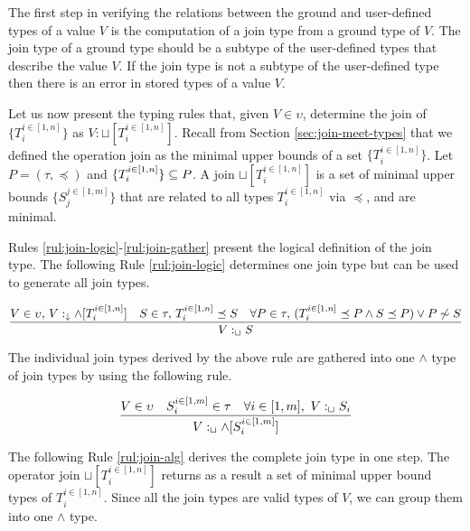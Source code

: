 \documentclass[runningheads]{llncs}
\newcommand{\darr}{\downarrow}
\newcommand{\llb}{\llbracket}
\newcommand{\rrb}{\rrbracket}
\newcommand{\nnotes}[1]{\indent\begin{small}-- \emph{#1}\hfill\break\end{small}}
\newcommand{\ennotes}[1]{\indent\begin{small}-- \emph{#1}\hfill\end{small}}
\begin{document}
The first step in verifying the relations between the ground and
user-defined types of a value $V$ is the computation of a join type
from a ground type of $V$. The join type of a ground type should be a
subtype of the user-defined types that describe the value $V$. If the
join type is not a subtype of the user-defined type then there is an
error in stored types of a value $V$.

Let us now present the typing rules that, given $V\in\upsilon$,
determine the join of $\{T_i^{i\in[1,n]}\}$ as
$V:\sqcup[T_i^{i\in[1,n]}]$. Recall from Section
\ref{sec:join-meet-types} that we defined the operation join as the
minimal upper bounds of a set $\{T_i^{i\in[1,n]}\}$. Let
$P=(\tau,\preceq)$ and $\{T_i^{i\in[1,n]}\}\subseteq\/P$. A join
$\sqcup[T_i^{i\in[1,n]}]$ is a set of minimal upper bounds
$\{S_j^{j\in[1,m]}\}$ that are related to all types $T_i^{i\in[1,n]}$
via $\preceq$, and are minimal.


Rules \ref{rul:join-logic}-\ref{rul:join-gather} present the logical
definition of the join type. The following Rule \ref{rul:join-logic}
determines one join type but can be used to generate all join types.


\begin{equation}
\label{rul:join-logic}
\dfrac{V\in\upsilon,\, \/V:_\darr\land[T_i^{i\in[1,n]}]\quad\/S\in\tau,\, T_i^{i\in[1,n]}\preceq\/S\quad\forall\/P\in\tau,\, (T_i^{i\in[1,n]}\preceq\/P\land\/S\preceq\/P)\lor\/P\not\sim\/S}
      {V:_\sqcup\/S}
\end{equation}

The individual join types derived by the above rule are gathered
into one $\land$ type of join types by using the following rule.

\begin{equation}
\label{rul:join-gather}
\dfrac{V\in\upsilon\quad\/S_i^{i\in[1,m]}\in\tau\quad\forall\/i\in[1,m],\ V:_\sqcup\/S_i}
{V:_{\sqcup}\land[S_i^{i\in[1,m]}]}
\end{equation}

The following Rule \ref{rul:join-alg} derives the complete join type
in one step. The operator join $\sqcup[T_i^{i\in[1,n]}]$ returns as a
result a set of minimal upper bound types of $T_i^{i\in[1,n]}$. Since
all the join types are valid types of $V$, we can group them into one
$\land$ type.
\end{document}
